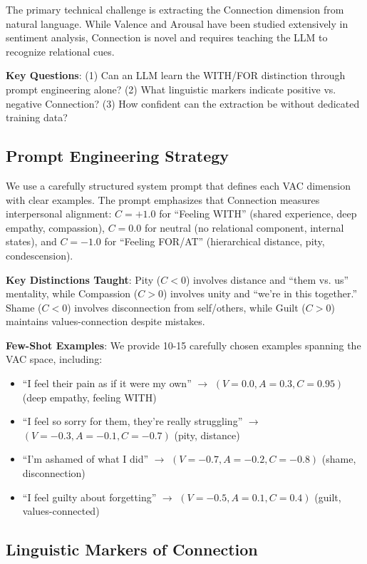 \documentclass[10pt,twocolumn]{article}
\begin{document}
The primary technical challenge is extracting the Connection dimension from natural language. While Valence and Arousal have been studied extensively in sentiment analysis, Connection is novel and requires teaching the LLM to recognize relational cues.

\textbf{Key Questions}: (1) Can an LLM learn the WITH/FOR distinction through prompt engineering alone? (2) What linguistic markers indicate positive vs. negative Connection? (3) How confident can the extraction be without dedicated training data?

\subsection{Prompt Engineering Strategy}

We use a carefully structured system prompt that defines each VAC dimension with clear examples. The prompt emphasizes that Connection measures interpersonal alignment: $C = +1.0$ for ``Feeling WITH'' (shared experience, deep empathy, compassion), $C = 0.0$ for neutral (no relational component, internal states), and $C = -1.0$ for ``Feeling FOR/AT'' (hierarchical distance, pity, condescension).

\textbf{Key Distinctions Taught}: Pity ($C < 0$) involves distance and ``them vs. us'' mentality, while Compassion ($C > 0$) involves unity and ``we're in this together.'' Shame ($C < 0$) involves disconnection from self/others, while Guilt ($C > 0$) maintains values-connection despite mistakes.

\textbf{Few-Shot Examples}: We provide 10-15 carefully chosen examples spanning the VAC space, including:
\begin{itemize}
    \item ``I feel their pain as if it were my own'' $\rightarrow$ $(V=0.0, A=0.3, C=0.95)$ (deep empathy, feeling WITH)
    \item ``I feel so sorry for them, they're really struggling'' $\rightarrow$ $(V=-0.3, A=-0.1, C=-0.7)$ (pity, distance)
    \item ``I'm ashamed of what I did'' $\rightarrow$ $(V=-0.7, A=-0.2, C=-0.8)$ (shame, disconnection)
    \item ``I feel guilty about forgetting'' $\rightarrow$ $(V=-0.5, A=0.1, C=0.4)$ (guilt, values-connected)
\end{itemize}

\subsection{Linguistic Markers of Connection}
\end{document}

